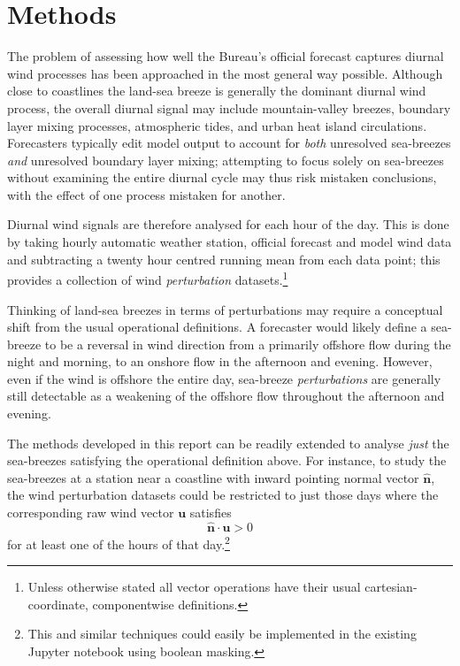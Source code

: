 \documentclass[10pt]{article}
\begin{document}
\section{Methods} \label{methods}
The problem of assessing how well the Bureau's official forecast captures diurnal wind processes has been approached in the most general way possible. Although close to coastlines the land-sea breeze is generally the dominant diurnal wind process, the overall diurnal signal may include mountain-valley breezes, boundary layer mixing processes, atmospheric tides, and urban heat island circulations. Forecasters typically edit model output to account for \emph{both} unresolved sea-breezes \emph{and} unresolved boundary layer mixing; attempting to focus solely on sea-breezes without examining the entire diurnal cycle may thus risk mistaken conclusions, with the effect of one process mistaken for another.

Diurnal wind signals are therefore analysed for each hour of the day. This is done by taking hourly automatic weather station, official forecast and model wind data and subtracting a twenty hour centred running mean from each data point; this provides a collection of wind \emph{perturbation} datasets.\footnote{Unless otherwise stated all vector operations have their usual cartesian-coordinate, componentwise definitions.} 

Thinking of land-sea breezes in terms of perturbations may require a conceptual shift from the usual operational definitions. A forecaster would likely define a sea-breeze to be a reversal in wind direction from a primarily offshore flow during the night and morning, to an onshore flow in the afternoon and evening. However, even if the wind is offshore the entire day, sea-breeze \emph{perturbations} are generally still detectable as a weakening of the offshore flow throughout the afternoon and evening. 

The methods developed in this report can be readily extended to analyse \emph{just} the sea-breezes satisfying the operational definition above. For instance, to study the sea-breezes at a station near a coastline with inward pointing normal vector $\widehat{\boldsymbol{n}}$, the wind perturbation datasets could be restricted to just those days where the corresponding raw wind vector $\boldsymbol{u}$ satisfies 
\begin{equation}
\widehat{\boldsymbol{n}} \cdot \boldsymbol{u} > 0
\end{equation}
for at least one of the hours of that day.\footnote{This and similar techniques could easily be implemented in the existing Jupyter notebook using boolean masking.}
\end{document}
